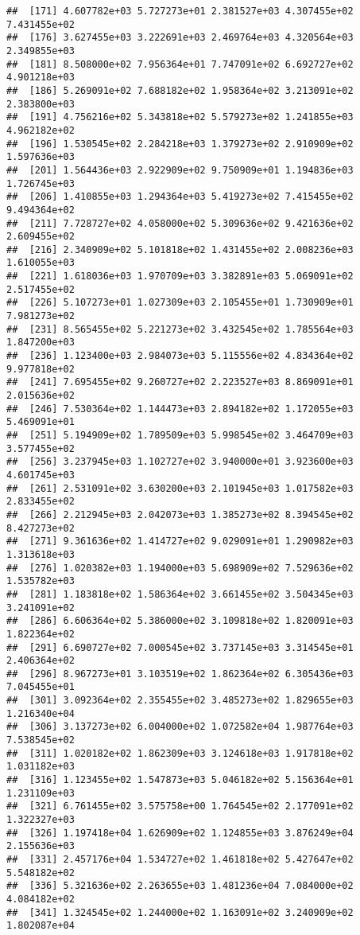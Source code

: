 \documentclass[]{article}
\begin{document}
\begin{verbatim}
##  [171] 4.607782e+03 5.727273e+01 2.381527e+03 4.307455e+02 7.431455e+02
##  [176] 3.627455e+03 3.222691e+03 2.469764e+03 4.320564e+03 2.349855e+03
##  [181] 8.508000e+02 7.956364e+01 7.747091e+02 6.692727e+02 4.901218e+03
##  [186] 5.269091e+02 7.688182e+02 1.958364e+02 3.213091e+02 2.383800e+03
##  [191] 4.756216e+02 5.343818e+02 5.579273e+02 1.241855e+03 4.962182e+02
##  [196] 1.530545e+02 2.284218e+03 1.379273e+02 2.910909e+02 1.597636e+03
##  [201] 1.564436e+03 2.922909e+02 9.750909e+01 1.194836e+03 1.726745e+03
##  [206] 1.410855e+03 1.294364e+03 5.419273e+02 7.415455e+02 9.494364e+02
##  [211] 7.728727e+02 4.058000e+02 5.309636e+02 9.421636e+02 2.609455e+02
##  [216] 2.340909e+02 5.101818e+02 1.431455e+02 2.008236e+03 1.610055e+03
##  [221] 1.618036e+03 1.970709e+03 3.382891e+03 5.069091e+02 2.517455e+02
##  [226] 5.107273e+01 1.027309e+03 2.105455e+01 1.730909e+01 7.981273e+02
##  [231] 8.565455e+02 5.221273e+02 3.432545e+02 1.785564e+03 1.847200e+03
##  [236] 1.123400e+03 2.984073e+03 5.115556e+02 4.834364e+02 9.977818e+02
##  [241] 7.695455e+02 9.260727e+02 2.223527e+03 8.869091e+01 2.015636e+02
##  [246] 7.530364e+02 1.144473e+03 2.894182e+02 1.172055e+03 5.469091e+01
##  [251] 5.194909e+02 1.789509e+03 5.998545e+02 3.464709e+03 3.577455e+02
##  [256] 3.237945e+03 1.102727e+02 3.940000e+01 3.923600e+03 4.601745e+03
##  [261] 2.531091e+02 3.630200e+03 2.101945e+03 1.017582e+03 2.833455e+02
##  [266] 2.212945e+03 2.042073e+03 1.385273e+02 8.394545e+02 8.427273e+02
##  [271] 9.361636e+02 1.414727e+02 9.029091e+01 1.290982e+03 1.313618e+03
##  [276] 1.020382e+03 1.194000e+03 5.698909e+02 7.529636e+02 1.535782e+03
##  [281] 1.183818e+02 1.586364e+02 3.661455e+02 3.504345e+03 3.241091e+02
##  [286] 6.606364e+02 5.386000e+02 3.109818e+02 1.820091e+03 1.822364e+02
##  [291] 6.690727e+02 7.000545e+02 3.737145e+03 3.314545e+01 2.406364e+02
##  [296] 8.967273e+01 3.103519e+02 1.862364e+02 6.305436e+03 7.045455e+01
##  [301] 3.092364e+02 2.355455e+02 3.485273e+02 1.829655e+03 1.216340e+04
##  [306] 3.137273e+02 6.004000e+02 1.072582e+04 1.987764e+03 7.538545e+02
##  [311] 1.020182e+02 1.862309e+03 3.124618e+03 1.917818e+02 1.031182e+03
##  [316] 1.123455e+02 1.547873e+03 5.046182e+02 5.156364e+01 1.231109e+03
##  [321] 6.761455e+02 3.575758e+00 1.764545e+02 2.177091e+02 1.322327e+03
##  [326] 1.197418e+04 1.626909e+02 1.124855e+03 3.876249e+04 2.155636e+03
##  [331] 2.457176e+04 1.534727e+02 1.461818e+02 5.427647e+02 5.548182e+02
##  [336] 5.321636e+02 2.263655e+03 1.481236e+04 7.084000e+02 4.084182e+02
##  [341] 1.324545e+02 1.244000e+02 1.163091e+02 3.240909e+02 1.802087e+04

\end{verbatim}
\end{document}
